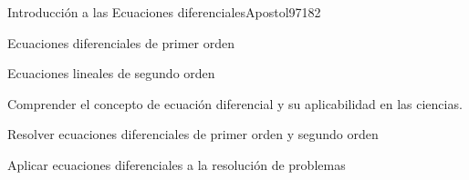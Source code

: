 \begin{syllabus}
\begin{unit}{Introducción a las Ecuaciones diferenciales}{Apostol97}{18}{2}
   \begin{topics}
      \item Ecuaciones diferenciales de primer orden
      \item Ecuaciones lineales de segundo orden
   \end{topics}

   \begin{learningoutcomes}
      \item Comprender el concepto de ecuación diferencial y su aplicabilidad en las ciencias.
      \item Resolver ecuaciones diferenciales de primer orden y segundo orden
      \item Aplicar ecuaciones diferenciales a la resolución de problemas
      \end{learningoutcomes}
\end{unit}



\begin{coursebibliography}
\end{coursebibliography}

\end{syllabus}
